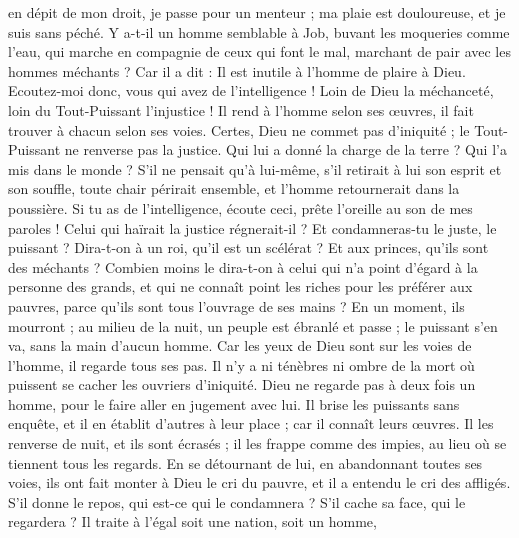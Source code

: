 \begin{multicols}{2}
en dépit de mon droit, je passe pour un menteur ; ma plaie est douloureuse, et je suis sans péché.
Y a-t-il un homme semblable à Job, buvant les moqueries comme l'eau,
qui marche en compagnie de ceux qui font le mal, marchant de pair avec les hommes méchants ?
Car il a dit : Il est inutile à l'homme de plaire à Dieu.
Ecoutez-moi donc, vous qui avez de l'intelligence ! Loin de Dieu la méchanceté, loin du Tout-Puissant l'injustice !
Il rend à l'homme selon ses œuvres, il fait trouver à chacun selon ses voies.
Certes, Dieu ne commet pas d'iniquité ; le Tout-Puissant ne renverse pas la justice.
Qui lui a donné la charge de la terre ? Qui l'a mis dans le monde ?
S'il ne pensait qu'à lui-même, s'il retirait à lui son esprit et son souffle,
toute chair périrait ensemble, et l'homme retournerait dans la poussière.
Si tu as de l'intelligence, écoute ceci, prête l'oreille au son de mes paroles !
Celui qui haïrait la justice régnerait-il ? Et condamneras-tu le juste, le puissant ?
Dira-t-on à un roi, qu'il est un scélérat ? Et aux princes, qu'ils sont des méchants ?
Combien moins le dira-t-on à celui qui n'a point d'égard à la personne des grands, et qui ne connaît point les riches pour les préférer aux pauvres, parce qu'ils sont tous l'ouvrage de ses mains ?
En un moment, ils mourront ; au milieu de la nuit, un peuple est ébranlé et passe ; le puissant s'en va, sans la main d'aucun homme.
Car les yeux de Dieu sont sur les voies de l'homme, il regarde tous ses pas.
Il n'y a ni ténèbres ni ombre de la mort où puissent se cacher les ouvriers d'iniquité.
Dieu ne regarde pas à deux fois un homme, pour le faire aller en jugement avec lui.
Il brise les puissants sans enquête, et il en établit d'autres à leur place ;
car il connaît leurs œuvres. Il les renverse de nuit, et ils sont écrasés ;
il les frappe comme des impies, au lieu où se tiennent tous les regards.
En se détournant de lui, en abandonnant toutes ses voies,
ils ont fait monter à Dieu le cri du pauvre, et il a entendu le cri des affligés.
S'il donne le repos, qui est-ce qui le condamnera ? S'il cache sa face, qui le regardera ? Il traite à l'égal soit une nation, soit un homme,

\end{multicols}
